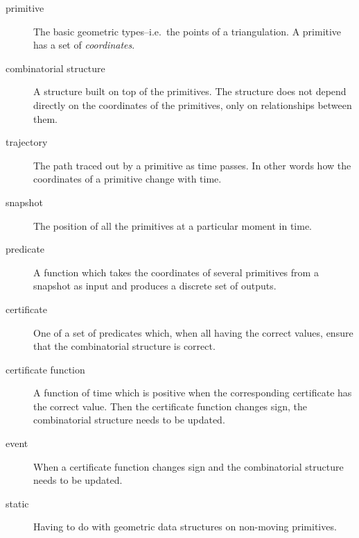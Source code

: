 \begin{description}
\item[primitive] The basic geometric types--i.e.\ the points of a triangulation. A primitive has a set of {\em coordinates}.
\item[combinatorial structure] A structure built on top of the primitives. The structure does not depend directly on the coordinates of the primitives, only on relationships between them.
\item[trajectory] The path traced out by a primitive as time passes. In other words how the coordinates of a primitive change with time.
\item[snapshot] The position of all the primitives at a particular moment in time.
\item[predicate] A function which takes the coordinates of several primitives from a snapshot as input and produces a discrete set of outputs.
\item[certificate] One of a set of predicates which, when all having the correct values, ensure that the combinatorial structure is correct.
\item[certificate function] A function of time which is positive when the corresponding certificate has the correct value. Then the certificate function changes sign, the combinatorial structure needs to be updated.
\item[event] When a certificate function changes sign and the combinatorial structure needs to be updated.
\item[static] Having to do with geometric data structures on non-moving primitives.
\end{description}









